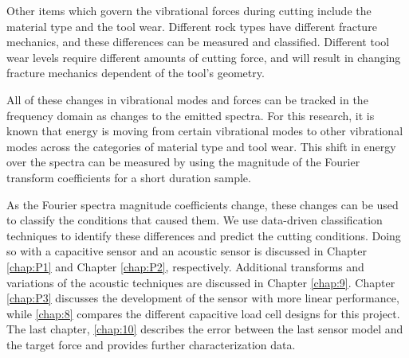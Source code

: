 Other items which govern the vibrational forces during cutting include
the material type and the tool wear. 
Different rock types have different fracture mechanics, 
and these differences can be measured and classified.
Different tool wear levels require different amounts of cutting force,
and will result in changing fracture mechanics dependent of the tool's geometry.

All of these changes in vibrational modes and forces can be tracked in the
frequency domain as changes to the emitted spectra. For this research,
it is known that energy is moving from certain vibrational
modes to other vibrational modes across the categories of material type
and tool wear. This shift in energy over the spectra can be measured
by using the magnitude of the Fourier transform coefficients for a 
short duration sample.

As the Fourier spectra magnitude coefficients change, these changes 
can be used to classify the conditions that caused them.
We use data-driven classification techniques to identify these differences and 
predict the cutting conditions.
Doing so with a capacitive sensor and an acoustic sensor
is discussed in Chapter \ref{chap:P1} and Chapter \ref{chap:P2}, respectively.
Additional transforms and variations of the acoustic techniques are discussed in Chapter \ref{chap:9}.
Chapter \ref{chap:P3} discusses the development of the sensor with more linear performance, 
while \ref{chap:8} compares the different capacitive load cell designs for this project.
The last chapter, \ref{chap:10} describes the error between the last sensor model and 
the target force and provides further characterization data.

